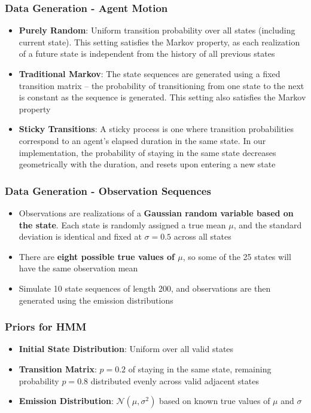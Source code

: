 \documentclass{beamer}
\begin{document}
\begin{frame}
    \frametitle{Data Generation - Agent Motion}
    \begin{itemize}
    \item \textbf{Purely Random}: Uniform transition probability over all states (including current state). This setting satisfies the Markov property, as each realization of a future state is independent from the history of all previous states
    \item \textbf{Traditional Markov}: The state sequences are generated using a fixed transition matrix -- the probability of transitioning from one state to the next is constant as the sequence is generated. This setting also satisfies the Markov property
    \item \textbf{Sticky Transitions}: A sticky process is one where transition probabilities correspond to an agent's elapsed duration in the same state. In our implementation, the probability of staying in the same state decreases geometrically with the duration, and resets upon entering a new state
    \end{itemize}
\end{frame}

\begin{frame}
    \frametitle{Data Generation - Observation Sequences}
    \begin{itemize}
        \item Observations are realizations of a \textbf{Gaussian random variable based on the state}. Each state is randomly assigned a true mean $\mu$, and the standard deviation is identical and fixed at $\sigma = 0.5$ across all states
        \item There are \textbf{eight possible true values of $\mu$}, so some of the 25 states will have the same observation mean
        \item Simulate 10 state sequences of length 200, and observations are then generated using the emission distributions
    \end{itemize}
\end{frame}

\begin{frame}
	\frametitle{Priors for HMM}
	\begin{itemize}
		\item \textbf{Initial State Distribution}: Uniform over all valid states
		\item \textbf{Transition Matrix}: $p = 0.2$ of staying in the same state, remaining probability $p = 0.8$ distributed evenly across valid adjacent states
		\item \textbf{Emission Distribution}: $\mathcal{N}(\mu, \sigma^2)$ based on known true values of $\mu$ and $\sigma$
	\end{itemize}
\end{frame}
\end{document}
